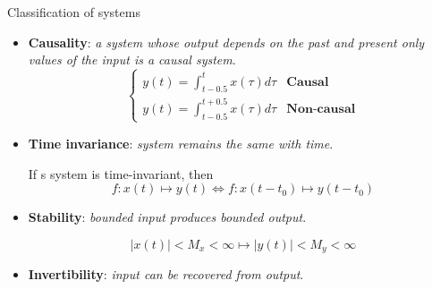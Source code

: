 \documentclass{beamer}
\begin{document}
\begin{frame}{Classification of systems}

\begin{itemize}
\item \textbf{Causality}: \textit{a system whose output depends on the past and present only values of the input is a causal system}.
\[ \begin{cases}
y(t) = \int_{t-0.5}^{t}x(\tau)d\tau & \mathrm{\textbf{Causal}} \\
y(t) = \int_{t-0.5}^{t+0.5}x(\tau)d\tau & \mathrm{\textbf{Non-causal}}
\end{cases}
\]

\item \textbf{Time invariance}: \textit{system remains the same with time}.

If s system is time-invariant, then
\[ f:x\left(t\right) \mapsto y\left(t\right) \iff f:x\left(t-t_0\right) \mapsto y\left(t-t_0\right)\]

\item \textbf{Stability}: \textit{bounded input produces bounded output}.

\[ \left|x\left(t\right)\right| < M_x < \infty \mapsto \left|y\left(t\right)\right| < M_y < \infty \]

\item \textbf{Invertibility}: \textit{input can be recovered from output}.
\end{itemize}
\end{frame}
\end{document}
